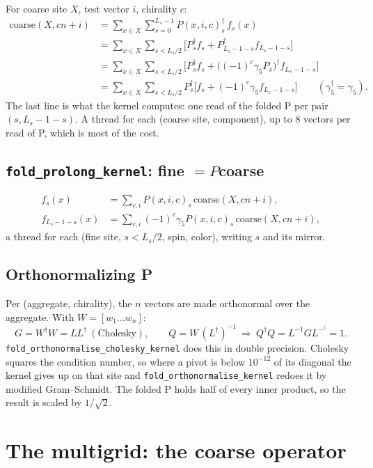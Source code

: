 \documentclass[11pt,a4paper]{article}
\numberwithin{equation}{section}
\newcommand{\code}[1]{\texttt{\small #1}}
\newcommand{\dg}{^{\dagger}}
\begin{document}
For coarse site $X$, test vector $i$, chirality $c$:
\begin{align}
\text{coarse}(X,cn+i) &= \sum_{x\in X}\sum_{s=0}^{L_s-1} P(x,i,c)_s\dg\,f_s(x)\\
&= \sum_{x\in X}\sum_{s<L_s/2}\Big[P_s\dg f_s + P_{L_s-1-s}\dg f_{L_s-1-s}\Big]\\
&= \sum_{x\in X}\sum_{s<L_s/2}\Big[P_s\dg f_s + \big((-1)^c\gamma_5P_s\big)\dg f_{L_s-1-s}\Big]\\
&= \sum_{x\in X}\sum_{s<L_s/2}P_s\dg\Big[f_s + (-1)^c\gamma_5f_{L_s-1-s}\Big]\qquad(\gamma_5\dg=\gamma_5).
\end{align}
The last line is what the kernel computes: one read of the folded P per pair $(s,L_s-1-s)$. A thread
for each (coarse site, component), up to 8 vectors per read of P, which is most of the cost.

\subsection{\code{fold\_prolong\_kernel}: fine $=P$coarse}

\begin{align}
f_s(x) &= \sum_{c,i} P(x,i,c)_s\,\text{coarse}(X,cn+i),\\
f_{L_s-1-s}(x) &= \sum_{c,i}(-1)^c\gamma_5P(x,i,c)_s\,\text{coarse}(X,cn+i),
\end{align}
a thread for each (fine site, $s<L_s/2$, spin, color), writing $s$ and its mirror.

\subsection{Orthonormalizing P}

Per (aggregate, chirality), the $n$ vectors are made orthonormal over the aggregate. With
$W=[w_1\dots w_n]$:
\begin{equation}
G = W\dg W = LL\dg\ (\text{Cholesky}),\qquad Q = W\,(L\dg)^{-1}\ \Rightarrow\ Q\dg Q = L^{-1}GL^{-\dg} = 1 .
\end{equation}
\code{fold\_orthonormalise\_cholesky\_kernel} does this in double precision. Cholesky squares the
condition number, so where a pivot is below $10^{-12}$ of its diagonal the kernel gives up on that
site and \code{fold\_orthonormalise\_kernel} redoes it by modified Gram–Schmidt. The folded P holds
half of every inner product, so the result is scaled by $1/\sqrt2$.

\section{The multigrid: the coarse operator}
\end{document}
